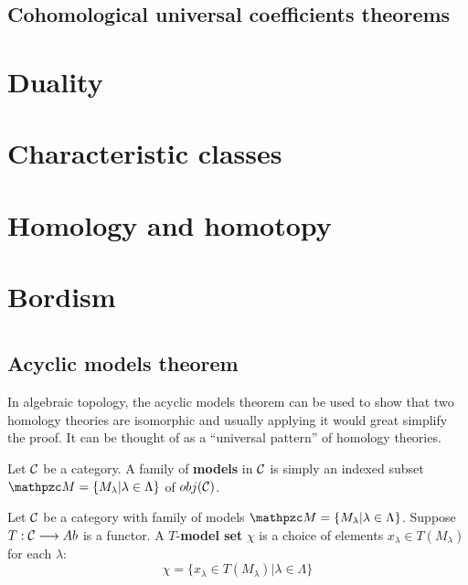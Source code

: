 \documentclass[11pt]{book} %
\begin{document}
\section{Cohomological universal coefficients theorems}

\chapter{Duality}

\chapter{Characteristic classes}

\chapter{Homology and homotopy}

\chapter{Bordism}
\appendix
\chapter{}
\section{Acyclic models theorem}
In algebraic topology, the acyclic models theorem can be used to show that two homology theories are isomorphic and usually applying it would great simplify the proof. It can be thought of as a ``universal pattern'' of homology theories.
\begin{definition}Let ${\cal C}$ be a category.
A family of \textbf{models} in ${\cal C}$ is simply an indexed subset $\pzm=\{M_\lambda|\lambda\in \Lambda\}$ of $obj({\cal C})$.
\end{definition}

\begin{definition}
Let ${\cal C}$ be a category with family of models $\pzm=\{M_\lambda|\lambda\in \Lambda\}$.  Suppose $T:{\cal C}\longrightarrow Ab$ is a functor. A $T$-\textbf{model set} $\chi$ is a choice of elements $x_\lambda\in T(M_\lambda)$ for each $\lambda$:
$$
\chi=\{x_\lambda\in T(M_\lambda)|\lambda\in \Lambda\}
$$
\end{definition}
\end{document}
